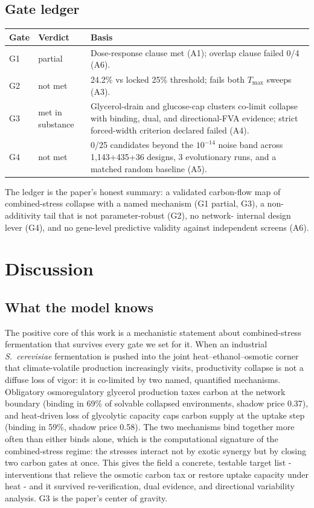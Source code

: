 \documentclass[12pt]{article}
\begin{document}
\subsection{Gate ledger}

\begin{center}
\begin{tabular}{l l p{7.5cm}}
\hline
Gate & Verdict & Basis \\
\hline
G1 & partial & Dose-response clause met (A1); overlap clause failed 0/4 (A6). \\
G2 & not met & 24.2\% vs locked 25\% threshold; fails both $T_{\max}$ sweeps (A3). \\
G3 & met in substance & Glycerol-drain and glucose-cap clusters co-limit collapse with binding, dual, and directional-FVA evidence; strict forced-width criterion declared failed (A4). \\
G4 & not met & 0/25 candidates beyond the $10^{-14}$ noise band across 1{,}143+435+36 designs, 3 evolutionary runs, and a matched random baseline (A5). \\
\hline
\end{tabular}
\end{center}

The ledger is the paper's honest summary: a validated carbon-flow map
of combined-stress collapse with a named mechanism (G1 partial, G3),
a non-additivity tail that is not parameter-robust (G2), no network-
internal design lever (G4), and no gene-level predictive validity
against independent screens (A6).
\section{Discussion}
\label{sec:discussion}

\subsection{What the model knows}

The positive core of this work is a mechanistic statement about
combined-stress fermentation that survives every gate we set for it.
When an industrial \emph{S.\ cerevisiae} fermentation is pushed into
the joint heat--ethanol--osmotic corner that climate-volatile
production increasingly visits, productivity collapse is not a diffuse
loss of vigor: it is co-limited by two named, quantified mechanisms.
Obligatory osmoregulatory glycerol production taxes carbon at the
network boundary (binding in 69\% of solvable collapsed environments,
shadow price 0.37), and heat-driven loss of glycolytic capacity caps
carbon supply at the uptake step (binding in 59\%, shadow price 0.58).
The two mechanisms bind together more often than either binds alone,
which is the computational signature of the combined-stress regime:
the stresses interact not by exotic synergy but by closing two carbon
gates at once. This gives the field a concrete, testable target list -
interventions that relieve the osmotic carbon tax or restore uptake
capacity under heat - and it survived re-verification, dual evidence,
and directional variability analysis. G3 is the paper's center of
gravity.
\end{document}
